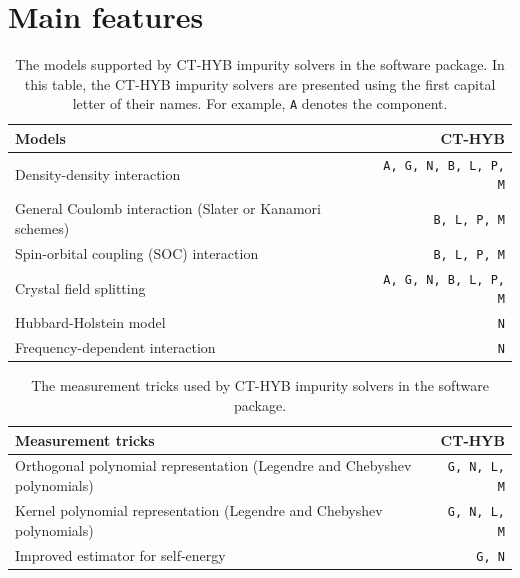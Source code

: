 \section{Main features}
\begin{table}[htbp]
\centering
\caption[The models supported by CT-HYB impurity solvers in the {\iqist} software package]{The models supported by CT-HYB impurity solvers in the {\iqist} software package. In this table, the CT-HYB impurity solvers are presented using the first capital letter of their names. For example, \texttt{A} denotes the {\azalea} component. \label{tab:feature_model}}
\begin{tabular}{lr}
\hline
\hline
Models & CT-HYB \\
\hline
Density-density interaction & \texttt{A, G, N, B, L, P, M}\\
General Coulomb interaction (Slater or Kanamori schemes) & \texttt{B, L, P, M} \\
Spin-orbital coupling (SOC) interaction & \texttt{B, L, P, M} \\
Crystal field splitting & \texttt{A, G, N, B, L, P, M} \\
Hubbard-Holstein model & \texttt{N} \\
Frequency-dependent interaction & \texttt{N} \\
\hline
\hline
\end{tabular}
\end{table}

\begin{table}[htbp]
\centering
\caption[The measurement tricks used by CT-HYB impurity solvers in the {\iqist} software package]{The measurement tricks used by CT-HYB impurity solvers in the {\iqist} software package. \label{tab:feature_tricks}}
\begin{tabular}{lr}
\hline
\hline
Measurement tricks & CT-HYB \\
\hline
Orthogonal polynomial representation (Legendre and Chebyshev polynomials) & \texttt{G, N, L, M} \\
Kernel polynomial representation (Legendre and Chebyshev polynomials) & \texttt{G, N, L, M} \\
Improved estimator for self-energy & \texttt{G, N} \\
\hline
\hline
\end{tabular}
\end{table}

